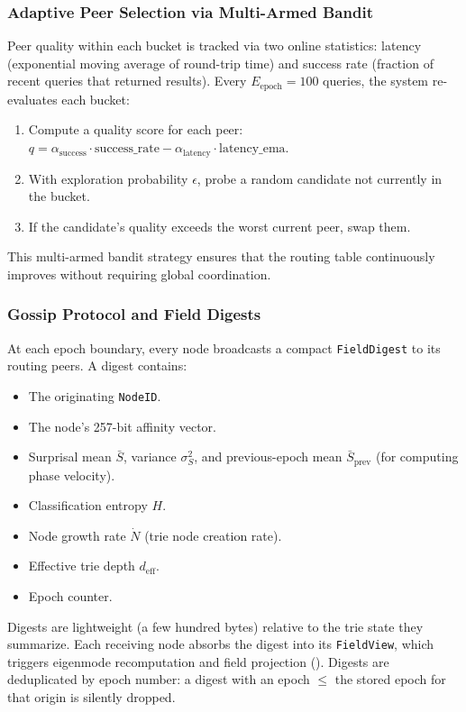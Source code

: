 \subsubsection{Adaptive Peer Selection via Multi-Armed Bandit}
\label{sec:mab_peers}

Peer quality within each bucket is tracked via two online statistics:
latency (exponential moving average of round-trip time) and success rate
(fraction of recent queries that returned results).  Every
$E_{\text{epoch}} = 100$ queries, the system re-evaluates each bucket:
\begin{enumerate}[nosep]
  \item Compute a quality score for each peer:
        $q = \alpha_{\text{success}} \cdot \text{success\_rate}
           - \alpha_{\text{latency}} \cdot \text{latency\_ema}$.
  \item With exploration probability $\epsilon$, probe a random
        candidate not currently in the bucket.
  \item If the candidate's quality exceeds the worst current peer,
        swap them.
\end{enumerate}
This multi-armed bandit strategy ensures that the routing table
continuously improves without requiring global coordination.

\subsubsection{Gossip Protocol and Field Digests}
\label{sec:gossip}

At each epoch boundary, every node broadcasts a compact
\texttt{FieldDigest} to its routing peers.  A digest contains:
\begin{itemize}[nosep]
  \item The originating \texttt{NodeID}.
  \item The node's 257-bit affinity vector.
  \item Surprisal mean $\bar{S}$, variance $\sigma_S^2$, and
        previous-epoch mean $\bar{S}_{\text{prev}}$ (for computing
        phase velocity).
  \item Classification entropy $H$.
  \item Node growth rate $\dot{N}$ (trie node creation rate).
  \item Effective trie depth $d_{\text{eff}}$.
  \item Epoch counter.
\end{itemize}
Digests are lightweight (a few hundred bytes) relative to the trie state
they summarize.  Each receiving node absorbs the digest into its
\texttt{FieldView}, which triggers eigenmode recomputation and field
projection ().  Digests are deduplicated by epoch
number: a digest with an epoch $\leq$ the stored epoch for that origin
is silently dropped.

